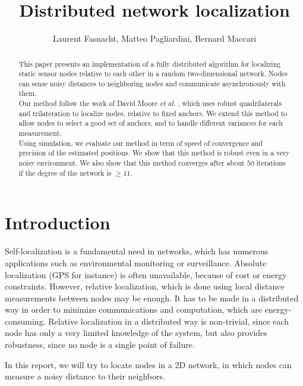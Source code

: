 \documentclass[letterpaper, 10 pt, conference]{ieeeconf}  %
\title{\LARGE \bf
 Distributed network localization
}
\author{Laurent Fasnacht, Matteo Pagliardini, Bernard Maccari%
}
\begin{document}
\maketitle
\thispagestyle{empty}
\pagestyle{empty}


\begin{abstract}
This paper presents an implementation of a fully distributed algorithm for localizing static sensor nodes relative to each other in a random two-dimensional network. Nodes can sense noisy distances to neighboring nodes and communicate asynchronously with them. \\
Our method follow the work of David Moore \emph{et al.} \cite{MooreTeller}, which uses robust quadrilaterals and trilateration to localize nodes, relative to fixed anchors. We extend this method to allow nodes to select a good set of anchors, and to handle different variances for each measurement. \\
Using simulation, we evaluate our method in term of speed of convergence and precision of the estimated positions. We show that this method is robust even in a very noisy environment. We also show that this method converges after about $50$ iterations if the degree of the network is $\geq 11$. \\
\end{abstract}


\section{Introduction}

Self-localization is a fundamental need in networks, which has numerous applications such as environmental monitoring or surveillance. Absolute localization (GPS for instance) is often unavailable, because of cost or energy constraints. However, relative localization, which is done using local distance measurements between nodes may be enough. It has to be made in a distributed way in order to minimize communications and computation, which are energy-consuming. Relative localization in a distributed way is non-trivial, since each node has only a very limited knowledge of the system, but also provides robustness, since no node is a single point of failure.

In this report, we will try to locate nodes in a 2D network, in which nodes can measure a noisy distance to their neighbors.
\end{document}
